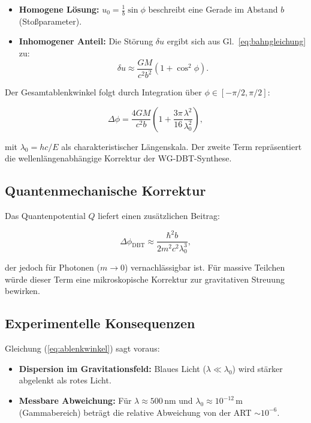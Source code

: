 \begin{itemize}
\item \textbf{Homogene Lösung:} $u_0 = \frac{1}{b} \sin \phi$ beschreibt eine Gerade im Abstand $b$ (Stoßparameter).
\item \textbf{Inhomogener Anteil:} Die Störung $\delta u$ ergibt sich aus Gl.~\ref{eq:bahngleichung} zu:
\begin{equation}
\delta u \approx \frac{GM}{c^2 b^2} (1 + \cos^2 \phi).
\end{equation}
\end{itemize}

Der Gesamtablenkwinkel folgt durch Integration über $\phi \in [-\pi/2, \pi/2]$:

\begin{equation}
\Delta \phi = \frac{4GM}{c^2 b} \left(1 + \frac{3\pi}{16} \frac{\lambda^2}{\lambda_0^2}\right),
\label{eq:ablenkwinkel}
\end{equation}

mit $\lambda_0 = hc/E$ als charakteristischer Längenskala. Der zweite Term repräsentiert die wellenlängenabhängige Korrektur der WG-DBT-Synthese.

\subsection{Quantenmechanische Korrektur}
Das Quantenpotential $Q$ liefert einen zusätzlichen Beitrag:

\begin{equation}
\Delta \phi_{\text{DBT}} \approx \frac{\hbar^2 b}{2m^2 c^2 \lambda_0^3},
\end{equation}

der jedoch für Photonen ($m \to 0$) vernachlässigbar ist. Für massive Teilchen würde dieser Term eine mikroskopische Korrektur zur gravitativen Streuung bewirken.

\subsection{Experimentelle Konsequenzen}
Gleichung (\ref{eq:ablenkwinkel}) sagt voraus:
\begin{itemize}
\item \textbf{Dispersion im Gravitationsfeld:} Blaues Licht ($\lambda \ll \lambda_0$) wird stärker abgelenkt als rotes Licht.
\item \textbf{Messbare Abweichung:} Für $\lambda \approx 500\,\text{nm}$ und $\lambda_0 \approx 10^{-12}\,\text{m}$ (Gammabereich) beträgt die relative Abweichung von der ART $\sim 10^{-6}$.
\end{itemize}

